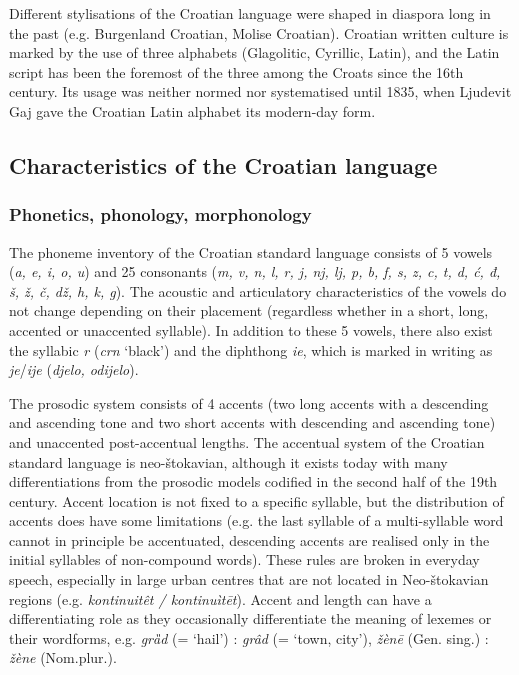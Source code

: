 \begin{multicols}{2}
Different stylisations of the Croatian language were shaped in diaspora long in the past (e.g. Burgenland Croatian, Molise Croatian). Croatian written culture is marked by the use of three alphabets (Glagolitic, Cyrillic, Latin), and the Latin script has been the foremost of the three among the Croats since the 16th century. Its usage was neither normed nor systematised until 1835, when Ljudevit Gaj gave the Croatian Latin alphabet its modern-day form.


\subsection{Characteristics of the Croatian language}

\subsubsection{Phonetics, phonology, morphonology}

The phoneme inventory of the Croatian standard language consists of 5 vowels (\emph{a, e, i, o, u}) and 25 consonants (\emph{m, v, n, l, r, j, nj, lj, p, b, f, s, z, c, t, d, ć, đ, š, ž, č, dž, h, k, g}).  The acoustic and articulatory characteristics of the vowels do not change depending on their placement (regardless whether in a short, long, accented or unaccented syllable). In addition to these 5 vowels, there also exist the syllabic \emph{r} (\emph{crn} ‘black’) and the diphthong \emph{ie}, which is marked in writing as \emph{je}/\emph{ije} (\emph{djelo, odijelo}).

The prosodic system consists of 4 accents (two long accents with a descending and ascending tone and two short accents with descending and ascending tone) and unaccented post-accentual lengths. The accentual system of the Croatian standard language is neo-štokavian, although it exists today with many differentiations from the prosodic models codified in the second half of the 19th century. Accent location is not fixed to a specific syllable, but the distribution of accents does have some limitations (e.g. the last syllable of a multi-syllable word cannot in principle be accentuated, descending accents are realised only in the initial syllables of non-compound words). These rules are broken in everyday speech, especially in large urban centres that are not located in Neo-štokavian regions (e.g. \emph{kontinuitêt  / kontinuìtēt}). Accent and length can have a differentiating role as they occasionally differentiate the meaning of lexemes or their wordforms, e.g. \emph{grȁd}  (= ‘hail’) : \emph{grâd} (= ‘town, city’), \emph{žènē}  (Gen. sing.) : \emph{žène}  (Nom.plur.). 


\end{multicols}
